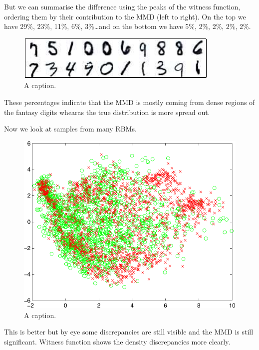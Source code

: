 \documentclass{article}
\begin{document}
But we can summarise the difference using the peaks of the witness function, ordering them by their contribution to the MMD (left to right).
On the top we have 29\%, 23\%, 11\%, 6\%, 3\%\ldots and on the bottom we have 5\%, 2\%, 2\%, 2\%, 2\%.

\begin{figure}[ht]
\centering
\includegraphics[width=0.98\columnwidth]{figures/rbm_witness_peaks}
\caption{
A caption.
}
\label{fig:rbm_witness_peaks}
\end{figure}

These percentages indicate that the MMD is mostly coming from dense regions of the fantasy digits whearas the true distribution is more spread out.

Now we look at samples from many RBMs.

\begin{figure}[ht]
\centering
\includegraphics[width=0.98\columnwidth]{figures/many_rbm_pca}
\caption{
A caption.
}
\label{fig:many_rbm_pca}
\end{figure}

This is better but by eye some discrepancies are still visible and the MMD is still significant.
Witness function shows the density discrepancies more clearly.
\end{document}

